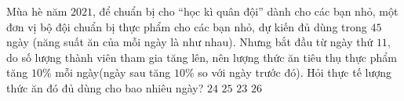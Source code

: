 \begin{ex}%
    [Chuyên ĐHSP - 2021]%
    Mùa hè năm $ 2021$, để chuẩn bị cho “học kì quân đội” dành cho các bạn nhỏ, một đơn vị bộ đội chuẩn bị thực phẩm cho các bạn nhỏ, dự kiến đủ dùng trong $ 45$ ngày (năng suất ăn của mỗi ngày là như nhau). Nhưng bắt đầu từ ngày thứ $ 11$, do số lượng thành viên tham gia tăng lên, nên lượng thức ăn tiêu thụ thực phẩm tăng $ 10\%$ mỗi ngày(ngày sau tăng $ 10\%$ so với ngày trước đó). Hỏi thực tế lượng thức ăn đó đủ dùng cho bao nhiêu ngày?
    \choice
    {$ 24$}
    {\True $ 25$}
    {$ 23$}
    {$ 26$}
\end{ex}

